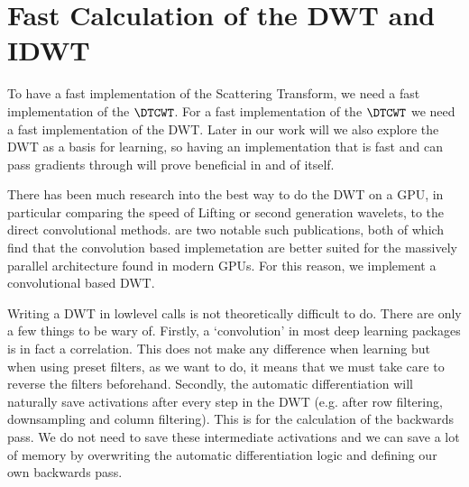\begin{figure}
  \centering
  
  \label{fig:ch3:autograd_blk}
\end{figure}


\section{Fast Calculation of the DWT and IDWT}\label{sec:ch3:dwt}
\begin{figure}
  \centering
  
  \label{fig:ch3:dwt}
\end{figure}

To have a fast implementation of the Scattering Transform, we need a fast
implementation of the $\DTCWT$. For a fast implementation of the $\DTCWT$ we
need a fast implementation of the DWT. Later in our work will we also explore
the DWT as a basis for learning, so having an implementation that is fast and
can pass gradients through will prove beneficial in and of itself.

There has been much research into the best way to do the DWT on a GPU, in
particular comparing the speed of Lifting \cite{sweldens_lifting_1998} or second
generation wavelets, to the direct convolutional methods.
\cite{tenllado_parallel_2008, galiano_improving_2011} are two notable such
publications, both of which find that the convolution based implemetation are
better suited for the massively parallel architecture found in modern GPUs. For
this reason, we implement a convolutional based DWT.

Writing a DWT in lowlevel calls is not theoretically difficult to do.
There are only a few things to be wary of. Firstly, a `convolution' in most deep
learning packages is in fact a correlation. This does not make any difference
when learning but when using preset filters, as we want to do, it means that we
must take care to reverse the filters beforehand. Secondly, the automatic 
differentiation will naturally save activations after every step in the DWT
(e.g. after row filtering, downsampling and column filtering). This is for the
calculation of the backwards pass. We do not need to save these intermediate
activations and we can save a lot of memory by overwriting the automatic
differentiation logic and defining our own backwards pass.

